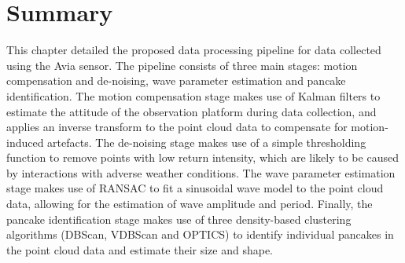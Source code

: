 \section{Summary}
\label{sec:ch6.section4}

This chapter detailed the proposed data processing pipeline for data collected using the Avia sensor. The pipeline consists of three main stages: motion compensation and de-noising, wave parameter estimation and pancake identification. The motion compensation stage makes use of Kalman filters to estimate the attitude of the observation platform during data collection, and applies an inverse transform to the point cloud data to compensate for motion-induced artefacts. The de-noising stage makes use of a simple thresholding function to remove points with low return intensity, which are likely to be caused by interactions with adverse weather conditions. The wave parameter estimation stage makes use of \ac{RANSAC} to fit a sinusoidal wave model to the point cloud data, allowing for the estimation of wave amplitude and period. Finally, the pancake identification stage makes use of three density-based clustering algorithms (\ac{DBScan}, \ac{VDBScan} and \ac{OPTICS}) to identify individual pancakes in the point cloud data and estimate their size and shape.

